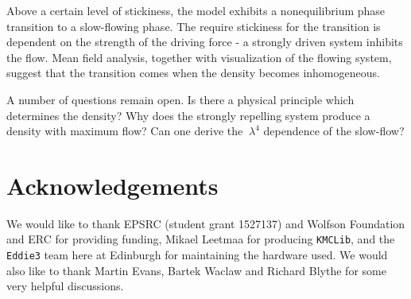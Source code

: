 \documentclass[
reprint, amsmath,amssymb, aps,
]{revtex4-1}
\begin{document}
Above a certain level of stickiness, the model exhibits a
nonequilibrium phase transition to a slow-flowing phase.  The require
stickiness for the transition is dependent on the strength of the
driving force - a strongly driven system inhibits the flow.  Mean field
analysis, together with visualization of the flowing system, suggest
that the transition comes when the density becomes inhomogeneous.

A number of questions remain open. Is there a physical principle which
determines the density?  Why does the strongly repelling system
produce a density with maximum flow?  Can one derive the $~\lambda^4$
dependence of the slow-flow?

\section*{Acknowledgements}
We would like to thank EPSRC (student grant 1527137) and Wolfson
Foundation and ERC for providing funding, Mikael Leetmaa for producing
\texttt{KMCLib}, and the \texttt{Eddie3} team here at Edinburgh for
maintaining the hardware used.  We would also like to thank Martin
Evans, Bartek Waclaw and Richard Blythe for some very helpful
discussions.


\end{document}
